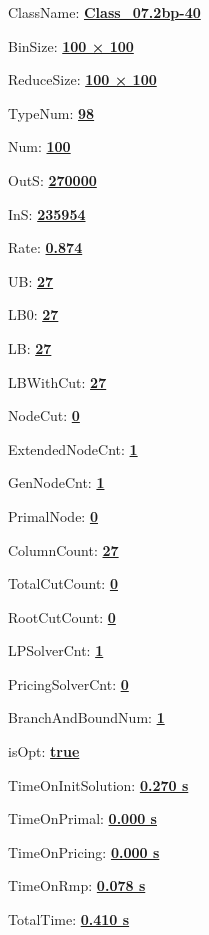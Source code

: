 \documentclass[11pt]{article}
\begin{document}
\pagestyle{empty}


ClassName: \underline{\textbf{Class_07.2bp-40}}
\par
BinSize: \underline{\textbf{100 × 100}}
\par
ReduceSize: \underline{\textbf{100 × 100}}
\par
TypeNum: \underline{\textbf{98}}
\par
Num: \underline{\textbf{100}}
\par
OutS: \underline{\textbf{270000}}
\par
InS: \underline{\textbf{235954}}
\par
Rate: \underline{\textbf{0.874}}
\par
UB: \underline{\textbf{27}}
\par
LB0: \underline{\textbf{27}}
\par
LB: \underline{\textbf{27}}
\par
LBWithCut: \underline{\textbf{27}}
\par
NodeCut: \underline{\textbf{0}}
\par
ExtendedNodeCnt: \underline{\textbf{1}}
\par
GenNodeCnt: \underline{\textbf{1}}
\par
PrimalNode: \underline{\textbf{0}}
\par
ColumnCount: \underline{\textbf{27}}
\par
TotalCutCount: \underline{\textbf{0}}
\par
RootCutCount: \underline{\textbf{0}}
\par
LPSolverCnt: \underline{\textbf{1}}
\par
PricingSolverCnt: \underline{\textbf{0}}
\par
BranchAndBoundNum: \underline{\textbf{1}}
\par
isOpt: \underline{\textbf{true}}
\par
TimeOnInitSolution: \underline{\textbf{0.270 s}}
\par
TimeOnPrimal: \underline{\textbf{0.000 s}}
\par
TimeOnPricing: \underline{\textbf{0.000 s}}
\par
TimeOnRmp: \underline{\textbf{0.078 s}}
\par
TotalTime: \underline{\textbf{0.410 s}}
\par
\newpage


\end{document}
